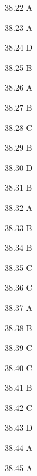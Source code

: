 \begin{Solution}{38.{22}}
A
\end{Solution}
\begin{Solution}{38.{23}}
A
\end{Solution}
\begin{Solution}{38.{24}}
D
\end{Solution}
\begin{Solution}{38.{25}}
B
\end{Solution}
\begin{Solution}{38.{26}}
A
\end{Solution}
\begin{Solution}{38.{27}}
B
\end{Solution}
\begin{Solution}{38.{28}}
C
\end{Solution}
\begin{Solution}{38.{29}}
B
\end{Solution}
\begin{Solution}{38.{30}}
D
\end{Solution}
\begin{Solution}{38.{31}}
B
\end{Solution}
\begin{Solution}{38.{32}}
A
\end{Solution}
\begin{Solution}{38.{33}}
B
\end{Solution}
\begin{Solution}{38.{34}}
B
\end{Solution}
\begin{Solution}{38.{35}}
C
\end{Solution}
\begin{Solution}{38.{36}}
C
\end{Solution}
\begin{Solution}{38.{37}}
A
\end{Solution}
\begin{Solution}{38.{38}}
B
\end{Solution}
\begin{Solution}{38.{39}}
C
\end{Solution}
\begin{Solution}{38.{40}}
C
\end{Solution}
\begin{Solution}{38.{41}}
B
\end{Solution}
\begin{Solution}{38.{42}}
C
\end{Solution}
\begin{Solution}{38.{43}}
D
\end{Solution}
\begin{Solution}{38.{44}}
A
\end{Solution}
\begin{Solution}{38.{45}}
A
\end{Solution}
